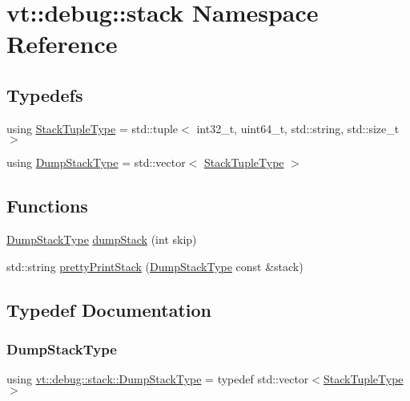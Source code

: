 \hypertarget{namespacevt_1_1debug_1_1stack}{}\section{vt\+:\+:debug\+:\+:stack Namespace Reference}
\label{namespacevt_1_1debug_1_1stack}
\subsection*{Typedefs}
\begin{DoxyCompactItemize}
\item 
using \hyperlink{namespacevt_1_1debug_1_1stack_a78258403837e0485bd23854241b12287}{Stack\+Tuple\+Type} = std\+::tuple$<$ int32\+\_\+t, uint64\+\_\+t, std\+::string, std\+::size\+\_\+t $>$
\item 
using \hyperlink{namespacevt_1_1debug_1_1stack_ad492fbef68802fc38922b49caf401d63}{Dump\+Stack\+Type} = std\+::vector$<$ \hyperlink{namespacevt_1_1debug_1_1stack_a78258403837e0485bd23854241b12287}{Stack\+Tuple\+Type} $>$
\end{DoxyCompactItemize}
\subsection*{Functions}
\begin{DoxyCompactItemize}
\item 
\hyperlink{namespacevt_1_1debug_1_1stack_ad492fbef68802fc38922b49caf401d63}{Dump\+Stack\+Type} \hyperlink{namespacevt_1_1debug_1_1stack_a89827f4a5411b18eb8fd0ea41d7b869d}{dump\+Stack} (int skip)
\item 
std\+::string \hyperlink{namespacevt_1_1debug_1_1stack_a4746a54afce7bc3b686cf6fa8c2d279f}{pretty\+Print\+Stack} (\hyperlink{namespacevt_1_1debug_1_1stack_ad492fbef68802fc38922b49caf401d63}{Dump\+Stack\+Type} const \&stack)
\end{DoxyCompactItemize}


\subsection{Typedef Documentation}
\mbox{\label{namespacevt_1_1debug_1_1stack_ad492fbef68802fc38922b49caf401d63}} 
\subsubsection{\texorpdfstring{Dump\+Stack\+Type}{DumpStackType}}
{\footnotesize\ttfamily using \hyperlink{namespacevt_1_1debug_1_1stack_ad492fbef68802fc38922b49caf401d63}{vt\+::debug\+::stack\+::\+Dump\+Stack\+Type} = typedef std\+::vector$<$\hyperlink{namespacevt_1_1debug_1_1stack_a78258403837e0485bd23854241b12287}{Stack\+Tuple\+Type}$>$}

